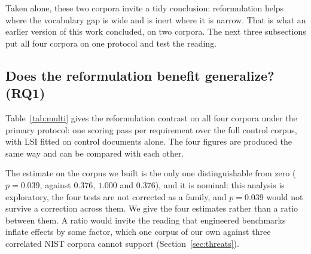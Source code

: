 \documentclass[smallextended,natbib]{svjour3}
\begin{document}
Taken alone, these two corpora invite a tidy conclusion: reformulation helps where the vocabulary gap is wide and is inert where it is narrow. That is what an earlier version of this work concluded, on two corpora. The next three subsections put all four corpora on one protocol and test the reading.

\subsection{Does the reformulation benefit generalize? (RQ1)}
\label{sec:results-multi}

Table~\ref{tab:multi} gives the reformulation contrast on all four corpora under the primary protocol: one scoring pass per requirement over the full control corpus, with LSI fitted on control documents alone. The four figures are produced the same way and can be compared with each other.

\begin{table}[htbp]
\caption{Effect of domain-aware reformulation on Top-1 accuracy, measured identically on all four corpora. One scoring pass per requirement over the full control corpus; LSI fitted on controls only. Intervals are requirement-level bootstrap, $p$ from paired sign-flip permutation. W/L/T counts requirements by whether reformulation turns a wrong top-1 into a right one, a right one into a wrong one, or leaves correctness unchanged. Ties include requirements whose top-ranked control changes without changing correctness.}
\label{tab:multi}
\centering
\setlength{\tabcolsep}{3pt}
\small
{}
\end{table}

The estimate on the corpus we built is the only one distinguishable from zero ($p = 0.039$, against $0.376$, $1.000$ and $0.376$), and it is nominal: this analysis is exploratory, the four tests are not corrected as a family, and $p = 0.039$ would not survive a correction across them. We give the four estimates rather than a ratio between them. A ratio would invite the reading that engineered benchmarks inflate effects by some factor, which one corpus of our own against three correlated NIST corpora cannot support (Section~\ref{sec:threats}).
\end{document}
